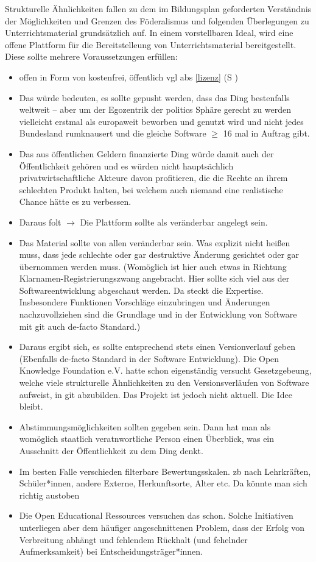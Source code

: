 Strukturelle Ähnlichkeiten fallen zu dem im Bildungsplan geforderten Verständnis der Möglichkeiten und Grenzen des Föderalismus und folgenden Überlegungen zu Unterrichtsmaterial grundsätzlich auf.
In einem vorstellbaren Ideal, wird eine offene Plattform für die Bereitstelleung von Unterrichtsmaterial bereitgestellt.
Diese sollte mehrere Voraussetzungen erfüllen:
\begin{itemize}
    \item offen in Form von kostenfrei, öffentlich \gls{vgl} \gls{abs} \ref{lizenz} (\gls{S} \pageref{lizenz})
    \item Das würde bedeuten, es sollte gepusht werden, dass das Ding bestenfalls weltweit -- aber um der Egozentrik der politics Sphäre gerecht zu werden vielleicht erstmal als europaweit beworben und genutzt wird und nicht jedes Bundesland rumknausert und die gleiche Software $\geq$ 16 mal in Auftrag gibt.
    \item Das aus öffentlichen Geldern finanzierte Ding würde damit auch der Öffentlichkeit gehören und es würden nicht hauptsächlich privatwirtschaftliche Akteure davon profitieren, die die Rechte an ihrem schlechten Produkt halten, bei welchem auch niemand eine realistische Chance hätte es zu verbessen.
    \item Daraus folt $\rightarrow$ Die Plattform sollte als veränderbar angelegt sein.
    \item Das Material sollte von allen veränderbar sein. Was explizit nicht heißen muss, dass jede schlechte oder gar destruktive Änderung gesichtet oder gar übernommen werden muss.
    (Womöglich ist hier auch etwas in Richtung Klarnamen-Registrierungszwang angebracht. Hier sollte sich viel aus der Softwareentwicklung abgeschaut werden. Da steckt die Expertise. Insbesondere Funktionen Vorschläge einzubringen und Änderungen nachzuvollziehen sind die Grundlage und in der Entwicklung von Software mit git auch de-facto Standard.)
    \item Daraus ergibt sich, es sollte entsprechend stets einen Versionverlauf geben (Ebenfalls de-facto Standard in der Software Entwicklung). Die Open Knowledge Foundation e.V. hatte schon eigenständig versucht Gesetzgebeung, welche viele strukturelle Ähnlichkeiten zu den Versionsverläufen von Software aufweist, in git abzubilden. Das Projekt ist jedoch nicht aktuell. Die Idee bleibt.
    \item Abstimmungsmöglichkeiten sollten gegeben sein. Dann hat man als womöglich staatlich veratnwortliche Person einen Überblick, was ein Ausschnitt der Öffentlichkeit zu dem Ding denkt.
    \item Im besten Falle verschieden filterbare Bewertungsskalen. \Gls{zb} nach Lehrkräften, Schüler*innen, andere Externe, Herkunftsorte, Alter etc. Da könnte man sich richtig austoben
    \item Die Open Educational Ressources versuchen das schon. Solche Initiativen unterliegen aber dem häufiger angeschnittenen Problem, dass der Erfolg von Verbreitung abhängt und fehlendem Rückhalt (und fehelnder Aufmerksamkeit) bei Entscheidungsträger*innen. 
\end{itemize}
